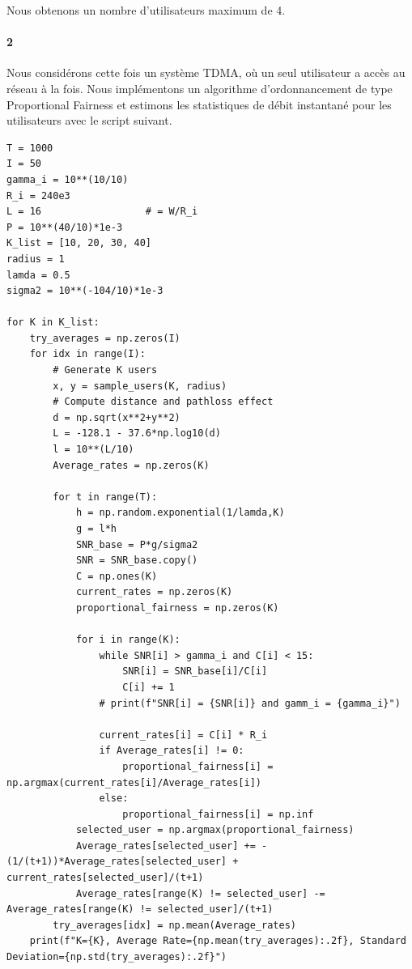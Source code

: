 \documentclass[a4paper,11pt,2]{article}
\begin{document}
Nous obtenons un nombre d'utilisateurs maximum de 4.

\paragraph{2} Nous considérons cette fois un système TDMA, où un seul utilisateur a accès au réseau à la fois. Nous implémentons un algorithme d'ordonnancement de type Proportional Fairness et estimons les statistiques de débit instantané pour les utilisateurs avec le script suivant.

\begin{center}
\begin{lstlisting}
T = 1000
I = 50
gamma_i = 10**(10/10)
R_i = 240e3
L = 16                  # = W/R_i
P = 10**(40/10)*1e-3
K_list = [10, 20, 30, 40]
radius = 1
lamda = 0.5
sigma2 = 10**(-104/10)*1e-3

for K in K_list:
    try_averages = np.zeros(I)
    for idx in range(I):
        # Generate K users
        x, y = sample_users(K, radius)
        # Compute distance and pathloss effect
        d = np.sqrt(x**2+y**2)
        L = -128.1 - 37.6*np.log10(d)
        l = 10**(L/10)
        Average_rates = np.zeros(K)

        for t in range(T):
            h = np.random.exponential(1/lamda,K)
            g = l*h
            SNR_base = P*g/sigma2
            SNR = SNR_base.copy()
            C = np.ones(K)
            current_rates = np.zeros(K)
            proportional_fairness = np.zeros(K)

            for i in range(K):
                while SNR[i] > gamma_i and C[i] < 15:
                    SNR[i] = SNR_base[i]/C[i]
                    C[i] += 1
                # print(f"SNR[i] = {SNR[i]} and gamm_i = {gamma_i}")

                current_rates[i] = C[i] * R_i
                if Average_rates[i] != 0:
                    proportional_fairness[i] = np.argmax(current_rates[i]/Average_rates[i])
                else:
                    proportional_fairness[i] = np.inf
            selected_user = np.argmax(proportional_fairness)
            Average_rates[selected_user] += -(1/(t+1))*Average_rates[selected_user] + current_rates[selected_user]/(t+1)
            Average_rates[range(K) != selected_user] -= Average_rates[range(K) != selected_user]/(t+1)
        try_averages[idx] = np.mean(Average_rates)
    print(f"K={K}, Average Rate={np.mean(try_averages):.2f}, Standard Deviation={np.std(try_averages):.2f}")
\end{lstlisting}
\end{center}
\end{document}
